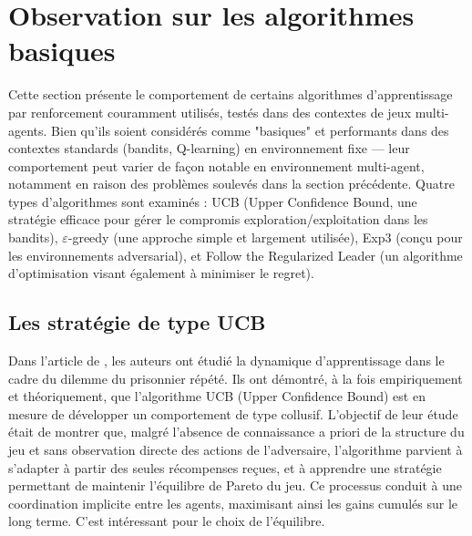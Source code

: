 \documentclass{article}
\theoremstyle{definition}
\begin{document}
\section{Observation sur les algorithmes basiques}
Cette section présente le comportement de certains algorithmes d'apprentissage par renforcement couramment utilisés, testés dans des contextes de jeux multi-agents. Bien qu’ils soient considérés comme "basiques" et performants dans des contextes standards (bandits, Q-learning) en environnement fixe — leur comportement peut varier de façon notable en environnement multi-agent, notamment en raison des problèmes soulevés dans la section précédente. Quatre types d’algorithmes sont examinés : UCB (Upper Confidence Bound, une stratégie efficace pour gérer le compromis exploration/exploitation dans les bandits), $\varepsilon$-greedy (une approche simple et largement utilisée), Exp3 (conçu pour les environnements adversarial), et Follow the Regularized Leader (un algorithme d’optimisation visant également à minimiser le regret).


\subsection{Les stratégie de type UCB}
Dans l'article de \cite{douglas_naive_2024}, les auteurs ont étudié la dynamique d’apprentissage dans le cadre du dilemme du prisonnier répété. Ils ont démontré, à la fois empiriquement et théoriquement, que l’algorithme UCB (Upper Confidence Bound) est en mesure de développer un comportement de type collusif. L’objectif de leur étude était de montrer que, malgré l’absence de connaissance a priori de la structure du jeu et sans observation directe des actions de l’adversaire, l’algorithme parvient à s’adapter à partir des seules récompenses reçues, et à apprendre une stratégie permettant de maintenir l’équilibre de Pareto du jeu. Ce processus conduit à une coordination implicite entre les agents, maximisant ainsi les gains cumulés sur le long terme. C'est intéressant pour le choix de l'équilibre. 
\end{document}
